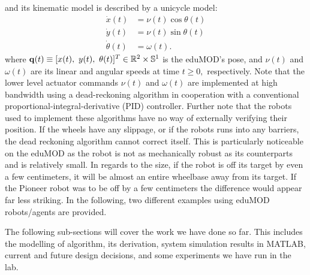  and its kinematic model is described by a unicycle model: %
%
\begin{subequations}
\begin{align}
\dot x(t) &= \nu(t)\cos\theta(t)\\
\dot y(t) &= \nu(t)\sin\theta(t)\\
\dot\theta(t) &= \omega(t).
\end{align}
\label{eq:unicycleModel}
\end{subequations}
%
where ${\bf q}(t) \equiv [x(t),~y(t),~\theta(t)]^T\in\mathbb{R}^2\times\mathbb{S}^1$ is the eduMOD's pose, and $\nu(t)$ and $\omega(t)$ are its linear and angular speeds at time $t\ge 0,$  respectively.
%
Note that the lower level actuator commands $\nu(t)$ and $\omega(t)$ are implemented at high bandwidth using a dead-reckoning algorithm in cooperation with a conventional proportional-integral-derivative (PID) controller. Further note that the robots used to implement these algorithms have no way of externally verifying their position. If the wheels have any slippage, or if the robots runs into any barriers, the dead reckoning algorithm cannot correct itself. This is particularly noticeable on the eduMOD as the robot is not as mechanically robust as its counterparts and is relatively small. In regards to the size, if the robot is off its target by even a few centimeters, it will be almost an entire wheelbase away from its target. If the Pioneer robot was to be off by a few centimeters the difference would appear far less striking. In the following, two different examples using eduMOD robots/agents are provided. 



The following sub-sections will cover the work we have done so far. This includes the modelling of algorithm, its derivation, system simulation results in MATLAB, current and future design decisions, and some experiments we have run in the lab.\\
 
